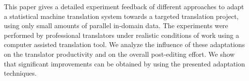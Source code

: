This paper gives a detailed experiment feedback of different approaches to adapt a statistical machine translation system towards a targeted translation project, using only small amounts of parallel in-domain data. The experiments were performed by professional translators under realistic conditions of work using a computer assisted translation tool. We analyze the influence of these adaptations on the translator productivity and on the overall post-editing effort. We show that significant improvements can be obtained by using the presented adaptation techniques.
